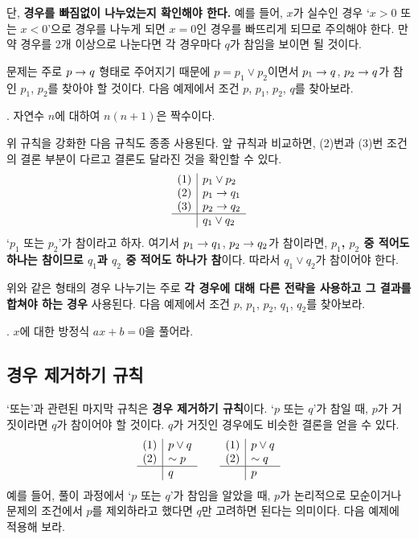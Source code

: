 단, \textbf{경우를 빠짐없이 나누었는지 확인해야 한다.} 예를 들어, \(x\)가 실수인 경우 `\(x > 0\) 또는 \(x < 0\)'으로 경우를 나누게 되면 \(x = 0\)인 경우를 빠뜨리게 되므로 주의해야 한다. 만약 경우를 2개 이상으로 나눈다면 각 경우마다 \(q\)가 참임을 보이면 될 것이다.

문제는 주로 \(p \rightarrow q\) 형태로 주어지기 때문에 \(p = p_1 \vee p_2\)이면서 \(p_1 \rightarrow q\), \(p_2 \rightarrow q\)가 참인 \(p_1\), \(p_2\)를 찾아야 할 것이다. 다음 예제에서 조건 \(p\), \(p_1\), \(p_2\), \(q\)를 찾아보라.

\bigskip

\ex. 자연수 \(n\)에 대하여 \(n(n + 1)\)은 짝수이다.

\pagebreak

위 규칙을 강화한 다음 규칙도 종종 사용된다. 앞 규칙과 비교하면, (2)번과 (3)번 조건의 결론 부분이 다르고 결론도 달라진 것을 확인할 수 있다.
\[
    \begin{array}{c|l}
        (1) & p_1 \vee p_2 \\ (2) & p_1 \rightarrow q_1 \\ (3) & p_2 \rightarrow q_2 \\\hline & q_1 \vee q_2
    \end{array}
\]
`\(p_1\) 또는 \(p_2\)'가 참이라고 하자. 여기서 \(p_1 \rightarrow q_1\), \(p_2 \rightarrow q_2\)가 참이라면, \textbf{\(p_1\), \(p_2\) 중 적어도 하나는 참이므로 \(q_1\)과 \(q_2\) 중 적어도 하나가 참}이다. 따라서 \(q_1 \vee q_2\)가 참이어야 한다.

위와 같은 형태의 경우 나누기는 주로 \textbf{각 경우에 대해 다른 전략을 사용하고 그 결과를 합쳐야 하는 경우} 사용된다. 다음 예제에서 조건 \(p\), \(p_1\), \(p_2\), \(q_1\), \(q_2\)를 찾아보라.

\bigskip

\ex. \(x\)에 대한 방정식 \(ax + b = 0\)을 풀어라.

\pagebreak

\subsection{경우 제거하기 규칙}

`또는'과 관련된 마지막 규칙은 \textbf{경우 제거하기 규칙}이다. `\(p\) 또는 \(q\)'가 참일 때, \(p\)가 거짓이라면 \(q\)가 참이어야 할 것이다. \(q\)가 거짓인 경우에도 비슷한 결론을 얻을 수 있다.
\[
    \begin{array}{c|l}
        (1) & p \vee q \\ (2) & \sim p \\\hline & q
    \end{array}
    \qquad
    \begin{array}{c|l}
        (1) & p \vee q \\ (2) & \sim q \\\hline & p
    \end{array}
\]
예를 들어, 풀이 과정에서 `\(p\) 또는 \(q\)'가 참임을 알았을 때, \(p\)가 논리적으로 모순이거나 문제의 조건에서 \(p\)를 제외하라고 했다면 \(q\)만 고려하면 된다는 의미이다. 다음 예제에 적용해 보라.

